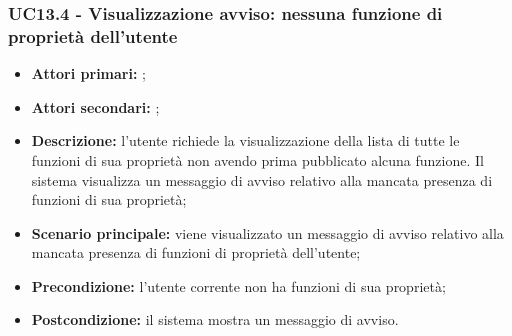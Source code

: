 \subsubsection{UC13.4 - Visualizzazione avviso: nessuna funzione di proprietà dell’utente}
\begin{itemize}
	\item \textbf{Attori primari:} \us{};
	\item \textbf{Attori secondari:} \re{};
	\item \textbf{Descrizione:} l’utente richiede la visualizzazione della lista di tutte le funzioni di sua proprietà non avendo prima pubblicato alcuna funzione. Il sistema visualizza un messaggio di avviso relativo alla mancata presenza di funzioni di sua proprietà;
	\item \textbf{Scenario principale:} viene visualizzato un messaggio di avviso relativo alla mancata presenza di funzioni di proprietà dell’utente;
	\item \textbf{Precondizione:} l’utente corrente non ha funzioni di sua proprietà;
	\item \textbf{Postcondizione:} il sistema mostra un messaggio di avviso.
\end{itemize}